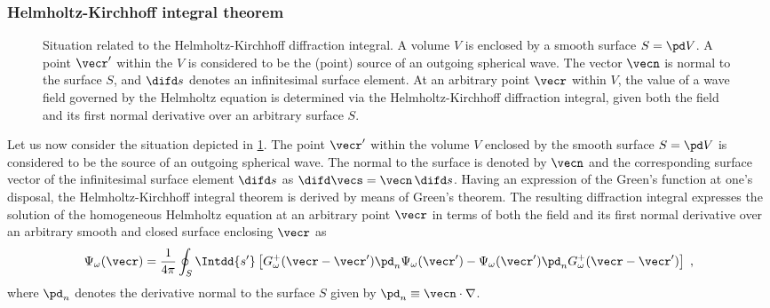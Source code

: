 \documentclass[
twoside,
openright,
titlepage,
numbers=noenddot,
headinclude,
fleqn,
a4paper,
footinclude=true,
cleardoublepage=empty,
abstractoff,
BCOR=5mm,
paper=a4,
fontsize=11pt,
british,ngerman,american,
]{scrreprt}
\begin{document}
\subsubsection{Helmholtz-Kirchhoff integral theorem}
\label{sec:helmholtz-kirchhoff}

\begin{figure}
  \centering
  \small
  \caption[Situation related to the Helmholtz-Kirchhoff diffraction
  integral.]{Situation related to the Helmholtz-Kirchhoff diffraction
    integral.  A volume $V$ is enclosed by a smooth surface $S=\pd V$.
    A point $\vecr'$ within the $V$ is considered to be the (point)
    source of an outgoing spherical wave.  The vector $\vecn$ is
    normal to the surface $S$, and $\difd s$ denotes an infinitesimal
    surface element.  At an arbitrary point $\vecr$ within $V$, the
    value of a wave field governed by the Helmholtz equation is
    determined via the Helmholtz-Kirchhoff diffraction integral, given
    both the field and its first normal derivative over an arbitrary
    surface $S$.}
     \label{fig:kirchhoff}
\end{figure}
Let us now consider the situation depicted in \cref{fig:kirchhoff}.
The point $\vecr'$ within the volume $V$ enclosed by the smooth
surface $S=\pd V$ is considered to be the source of an outgoing
spherical wave.  The normal to the surface is denoted by $\vecn$ and
the corresponding surface vector of the infinitesimal surface element
$\difd s$ as $\difd\vecs=\vecn\,\difd s$.  Having an expression of the
Green's function at one's disposal, the Helmholtz-Kirchhoff integral
theorem is derived by means of Green's theorem.  The resulting
diffraction integral expresses the solution of the homogeneous
Helmholtz equation at an arbitrary point $\vecr$ in terms of both the
field and its first normal derivative over an arbitrary smooth and
closed surface enclosing $\vecr$ \cite{PaganinBook,BornWolf} as
\begin{equation}
  \label{eq:helmholtz-kirchhoff}
  \Psi_\omega(\vecr) = \frac{1}{4\pi}\oint_{S}\Intdd{s'}
  \left[G^+_\omega(\vecr-\vecr')\pd_n\Psi_\omega(\vecr') 
    - \Psi_\omega(\vecr')\pd_n G^+_\omega(\vecr-\vecr') \right] \;,
\end{equation}
where $\pd_n$ denotes the derivative normal to the surface $S$ given
by $\pd_n\equiv\vecn\cdot\nabla$.
\end{document}

